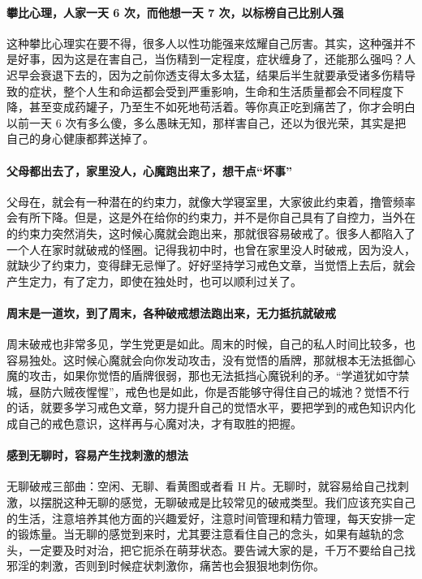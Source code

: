\paragraph{攀比心理，人家一天 6 次，而他想一天 7 次，以标榜自己比别人强}

这种攀比心理实在要不得，很多人以性功能强来炫耀自己厉害。其实，这种强并不是好事，因为这是在害自己，当伤精到一定程度，症状缠身了，还能那么强吗？人迟早会衰退下去的，因为之前你透支得太多太猛，结果后半生就要承受诸多伤精导致的症状，整个人生和命运都会受到严重影响，生命和生活质量都会不同程度下降，甚至变成药罐子，乃至生不如死地苟活着。等你真正吃到痛苦了，你才会明白以前一天 6 次有多么傻，多么愚昧无知，那样害自己，还以为很光荣，其实是把自己的身心健康都葬送掉了。

\paragraph{父母都出去了，家里没人，心魔跑出来了，想干点“坏事”}

父母在，就会有一种潜在的约束力，就像大学寝室里，大家彼此约束着，撸管频率会有所下降。但是，这是外在给你的约束力，并不是你自己具有了自控力，当外在的约束力突然消失，这时候心魔就会跑出来，那就很容易破戒了。很多人都陷入了一个人在家时就破戒的怪圈。记得我初中时，也曾在家里没人时破戒，因为没人，就缺少了约束力，变得肆无忌惮了。好好坚持学习戒色文章，当觉悟上去后，就会产生定力，有了定力，即使在独处时，也可以顺利过关了。

\paragraph{周末是一道坎，到了周末，各种破戒想法跑出来，无力抵抗就破戒}

周末破戒也非常多见，学生党更是如此。周末的时候，自己的私人时间比较多，也容易独处。这时候心魔就会向你发动攻击，没有觉悟的盾牌，那就根本无法抵御心魔的攻击，如果你觉悟的盾牌很弱，那也无法抵挡心魔锐利的矛。“学道犹如守禁城，昼防六贼夜惺惺”，戒色也是如此，你是否能够守得住自己的城池？觉悟不行的话，就要多学习戒色文章，努力提升自己的觉悟水平，要把学到的戒色知识内化成自己的戒色意识，这样再与心魔对决，才有取胜的把握。

\paragraph{感到无聊时，容易产生找刺激的想法}

无聊破戒三部曲：空闲、无聊、看黄图或者看 H 片。无聊时，就容易给自己找刺激，以摆脱这种无聊的感觉，无聊破戒是比较常见的破戒类型。我们应该充实自己的生活，注意培养其他方面的兴趣爱好，注意时间管理和精力管理，每天安排一定的锻炼量。当无聊的感觉到来时，尤其要注意看住自己的念头，如果有越轨的念头，一定要及时对治，把它扼杀在萌芽状态。要告诫大家的是，千万不要给自己找邪淫的刺激，否则到时候症状刺激你，痛苦也会狠狠地刺伤你。

